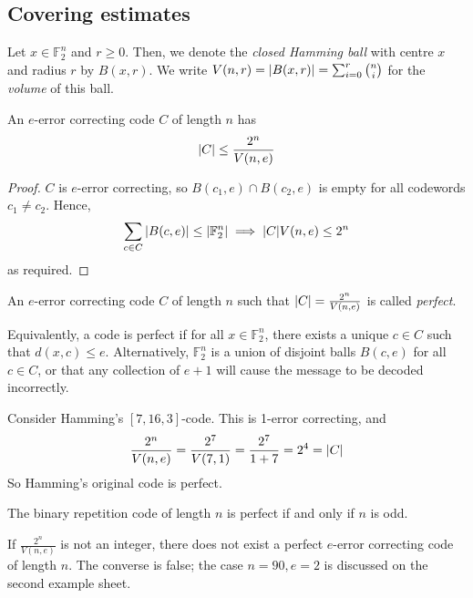 \subsection{Covering estimates}
\begin{definition}
    Let \( x \in \mathbb F_2^n \) and \( r \geq 0 \).
    Then, we denote the \emph{closed Hamming ball} with centre \( x \) and radius \( r \) by \( B(x,r) \).
    We write \( V(n,r) = \abs{B(x,r)} = \sum_{i=0}^r \binom{n}{i} \) for the \emph{volume} of this ball.
\end{definition}
\begin{lemma}
    An \( e \)-error correcting code \( C \) of length \( n \) has
    \[ \abs{C} \leq \frac{2^n}{V(n,e)} \]
\end{lemma}
\begin{proof}
    \( C \) is \( e \)-error correcting, so \( B(c_1, e) \cap B(c_2, e) \) is empty for all codewords \( c_1 \neq c_2 \).
    Hence,
    \[ \sum_{c \in C} \abs{B(c,e)}  \leq \abs{\mathbb F_2^n} \implies \abs{C} V(n,e) \leq 2^n \]
    as required.
\end{proof}
\begin{definition}
    An \( e \)-error correcting code \( C \) of length \( n \) such that \( \abs{C} = \frac{2^n}{V(n,e)} \) is called \emph{perfect}.
\end{definition}
\begin{remark}
    Equivalently, a code is perfect if for all \( x \in \mathbb F_2^n \), there exists a unique \( c \in C \) such that \( d(x,c) \leq e \).
    Alternatively, \( \mathbb F_2^n \) is a union of disjoint balls \( B(c,e) \) for all \( c \in C \), or that any collection of \( e + 1 \) will cause the message to be decoded incorrectly.
\end{remark}
\begin{example}
    Consider Hamming's \( [7,16,3] \)-code.
    This is 1-error correcting, and
    \[ \frac{2^n}{V(n,e)} = \frac{2^7}{V(7,1)} = \frac{2^7}{1+7} = 2^4 = \abs{C} \]
    So Hamming's original code is perfect.
\end{example}
\begin{example}
    The binary repetition code of length \( n \) is perfect if and only if \( n \) is odd.
\end{example}
\begin{remark}
    If \( \frac{2^n}{V(n,e)} \) is not an integer, there does not exist a perfect \( e \)-error correcting code of length \( n \).
    The converse is false; the case \( n = 90, e = 2 \) is discussed on the second example sheet.
\end{remark}
